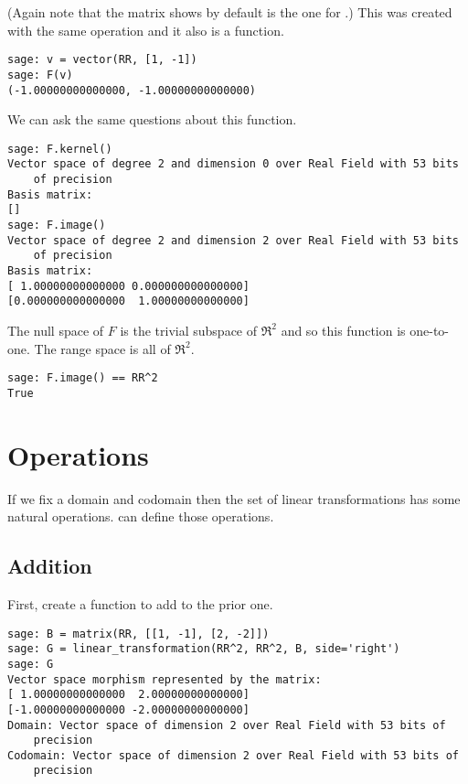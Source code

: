 (Again note that the matrix \Sage{} shows by default is the one for 
.)
This was created with the same  operation
and it also is a function.
\begin{lstlisting}
sage: v = vector(RR, [1, -1])
sage: F(v)
(-1.00000000000000, -1.00000000000000)  
\end{lstlisting}
We can ask the same questions about this function.
\begin{lstlisting}
sage: F.kernel()
Vector space of degree 2 and dimension 0 over Real Field with 53 bits 
    of precision
Basis matrix:
[]
sage: F.image()
Vector space of degree 2 and dimension 2 over Real Field with 53 bits 
    of precision
Basis matrix:
[ 1.00000000000000 0.000000000000000]
[0.000000000000000  1.00000000000000]
\end{lstlisting}
The null space of $F$ is the trivial subspace of $\Re^2$ and so this function
is one-to-one.
The range space is all of $\Re^2$.
\begin{lstlisting} 
sage: F.image() == RR^2
True
\end{lstlisting}





\section{Operations}

If we fix a domain and codomain then 
the set of linear transformations has some natural operations.
\Sage{} can define those operations. 

\subsection{Addition}
First, create a function to add to the prior one. 
\begin{lstlisting}
sage: B = matrix(RR, [[1, -1], [2, -2]])
sage: G = linear_transformation(RR^2, RR^2, B, side='right')
sage: G
Vector space morphism represented by the matrix:
[ 1.00000000000000  2.00000000000000]
[-1.00000000000000 -2.00000000000000]
Domain: Vector space of dimension 2 over Real Field with 53 bits of 
    precision
Codomain: Vector space of dimension 2 over Real Field with 53 bits of 
    precision
\end{lstlisting}

